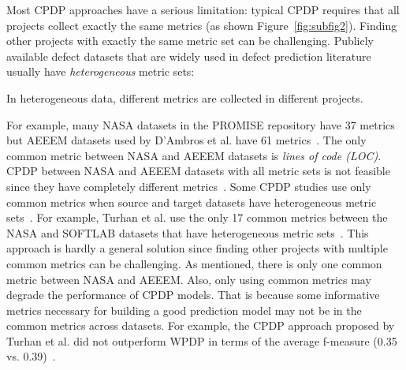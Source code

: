 Most CPDP approaches have a serious limitation:
typical CPDP requires that all projects collect exactly the same metrics (as shown Figure~\ref{fig:subfig2}). Finding other projects with exactly
the same metric set can be challenging. Publicly available defect
datasets that are widely used in defect prediction literature usually have
{\em heterogeneous} metric sets:
\squishlist
\item

In heterogeneous data, different metrics are collected in different projects.
\item
For example, many NASA datasets in the PROMISE repository have 37 metrics but
AEEEM datasets used by D'Ambros et al. have 61
metrics~\cite{DAmbros12,promise12}.
The only common metric between NASA and AEEEM datasets is {\em lines of
code (LOC)}.
CPDP between NASA and AEEEM
datasets with all metric sets is not feasible since they have
completely different metrics~\cite{Turhan09}.
\squishend
Some CPDP studies use only common metrics when source and target datasets have
heterogeneous metric sets~\cite{Ma12,Turhan09}.
For example, Turhan et al. use the only 17 common metrics between the NASA and
SOFTLAB datasets that have heterogeneous metric sets~\cite{Turhan09}. 
This approach is hardly a general solution since
finding other projects with multiple common metrics can be challenging. As
mentioned, there is only one common metric between NASA and AEEEM. Also,
only using common metrics may degrade the performance of CPDP models.
That is because some informative metrics necessary for building a good prediction model may not
be in the common metrics across datasets. For example, the CPDP approach proposed by Turhan et al. did not
outperform WPDP in terms of the average
f-measure (0.35 vs. 0.39)~\cite{Turhan09}.

